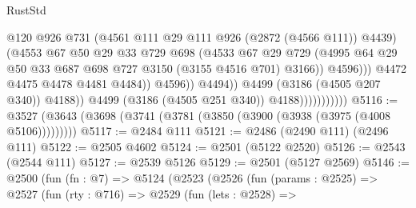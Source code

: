 \begin{lexlean}{RustStd}
\begin{coremodule}
                                              @120
                                              @926
                                              @731
                                              (@4561 @111 @29 @111 @926 (@2872 (@4566 @111)) @4439)
                                              (@4553
                                                @67
                                                @50
                                                @29
                                                @33
                                                @729
                                                @698
                                                (@4533
                                                  @67
                                                  @29
                                                  @729
                                                  (@4995
                                                    @64
                                                    @29
                                                    @50
                                                    @33
                                                    @687
                                                    @698
                                                    @727
                                                    @3150
                                                    (@3155 @4516 @701)
                                                    @3166))
                                                @4596)))
                                          @4472
                                          @4475
                                          @4478
                                          @4481
                                          @4484))
                                      @4596))
                                  @4494))
                              @4499
                              (@3186 (@4505 @207 @340))
                              @4188))
                          @4499
                          (@3186 (@4505 @251 @340))
                          @4188)))))))))))
@5116 := @3527 (@3643 (@3698 (@3741 (@3781 (@3850 (@3900 (@3938 (@3975 (@4008 @5106)))))))))
@5117 := @2484 @111
@5121 := @2486 (@2490 @111) (@2496 @111)
@5122 := @2505 @4602
@5124 := @2501 (@5122 @2520)
@5126 := @2543 (@2544 @111)
@5127 := @2539 @5126
@5129 := @2501 (@5127 @2569)
@5146 := @2500
    (fun (fn : @7) =>
    @5124
      (@2523
        (@2526
          (fun (params : @2525) =>
          @2527
            (fun (rty : @716) =>
            @2529
              (fun (lets : @2528) =>

\end{coremodule}
\end{lexlean}
